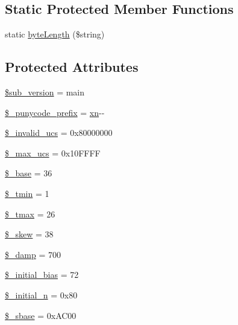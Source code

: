 \subsection*{Static Protected Member Functions}
\begin{DoxyCompactItemize}
\item 
static \hyperlink{classidna__convert_a964eafd23cc4069f6aa9912bcdfb61c7}{byte\+Length} (\$string)
\end{DoxyCompactItemize}
\subsection*{Protected Attributes}
\begin{DoxyCompactItemize}
\item 
\hyperlink{classidna__convert_a14d96b4efeba28496661be46a6f14a5c}{\$sub\+\_\+version} = \textquotesingle{}main\textquotesingle{}
\item 
\hyperlink{classidna__convert_a314677b13ded35e088abec26ef7c8be8}{\$\+\_\+punycode\+\_\+prefix} = \textquotesingle{}\hyperlink{jquery-1_8x_8min_8js_a5d600963c6441f15f548bc0b847b6a04}{xn}-\/-\/\textquotesingle{}
\item 
\hyperlink{classidna__convert_a741bab9cbe7aec53249d714143bbe53b}{\$\+\_\+invalid\+\_\+ucs} = 0x80000000
\item 
\hyperlink{classidna__convert_aea20377d4d2659186a1901d6a66f5d58}{\$\+\_\+max\+\_\+ucs} = 0x10\+F\+F\+FF
\item 
\hyperlink{classidna__convert_ae8b8b5bddd4d164dea30f7097274ac24}{\$\+\_\+base} = 36
\item 
\hyperlink{classidna__convert_a25ba1aab448cedd1159da1a09fb97720}{\$\+\_\+tmin} = 1
\item 
\hyperlink{classidna__convert_a44dfb166546f087150aa6c1ffdde2473}{\$\+\_\+tmax} = 26
\item 
\hyperlink{classidna__convert_ae444bd5e85604ec097705a95ab21f144}{\$\+\_\+skew} = 38
\item 
\hyperlink{classidna__convert_af291107adc3fc7062e734fe5654a5b4c}{\$\+\_\+damp} = 700
\item 
\hyperlink{classidna__convert_a9baf9ea9ebceee6e4dffb60cce1d20bc}{\$\+\_\+initial\+\_\+bias} = 72
\item 
\hyperlink{classidna__convert_a02dd88f575541a67a6312a15af340733}{\$\+\_\+initial\+\_\+n} = 0x80
\item 
\hyperlink{classidna__convert_ab4e5849131d5a242fc67d3bb75f81899}{\$\+\_\+sbase} = 0x\+A\+C00
\item 

\end{DoxyCompactItemize}
